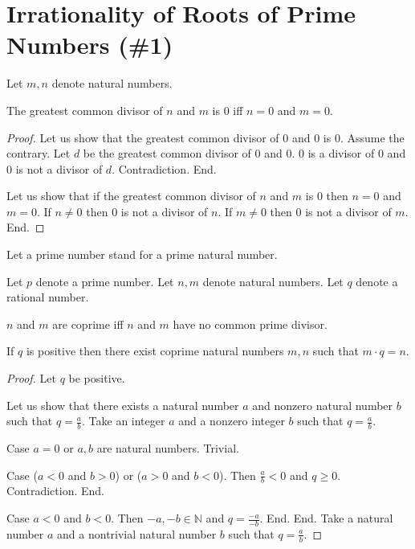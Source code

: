 \documentclass{article}
\begin{document}
\section{Irrationality of Roots of Prime Numbers (\#1)}

\begin{forthel}
Let $m,n$ denote natural numbers.

\begin{lemma}
The greatest common divisor of $n$ and $m$ is 0 iff $n = 0$ and $m = 0$.
\end{lemma}
\begin{proof}
Let us show that the greatest common divisor of 0 and 0 is 0.
  Assume the contrary. Let $d$ be the greatest common divisor of 0 and 0.
  0 is a divisor of 0 and 0 is not a divisor of $d$. Contradiction. End.

Let us show that if the greatest common divisor of $n$ and $m$ is 0 then $n = 0$ and $m = 0$.
  If $n \neq 0$ then 0 is not a divisor of $n$.
  If $m \neq 0$ then 0 is not a divisor of $m$.
End.
\end{proof}

  Let a prime number stand for a prime natural number.

    Let $p$ denote a prime number.
    Let $n,m$ denote natural numbers.
    Let $q$ denote a rational number.

    \begin{definition}
      $n$ and $m$ are coprime iff $n$ and $m$ have no common prime divisor.
    \end{definition}

    \begin{lemma}
      If $q$ is positive then there exist coprime natural numbers $m,n$ such that $m \cdot q = n$.
    \end{lemma}
\begin{proof}
Let $q$ be positive.

Let us show that there exists a natural number $a$ and nonzero natural number $b$ such that $q = \frac{a}{b}$.
  Take an integer $a$ and a nonzero integer $b$ such that $q = \frac{a}{b}$.

  Case $a = 0$ or $a,b$ are natural numbers. Trivial.

  Case ($a < 0$ and $b > 0$) or ($a > 0$ and $b < 0$). Then $\frac{a}{b} < 0$ and $q \geq 0$. Contradiction. End.

  Case $a < 0$ and $b < 0$. Then $-a,-b \in \mathbb{N}$ and $q = \frac{-a}{-b}$. End.
End.
Take a natural number $a$ and a nontrivial natural number $b$ such that $q = \frac{a}{b}$.


\end{proof}
\end{forthel}
\end{document}
